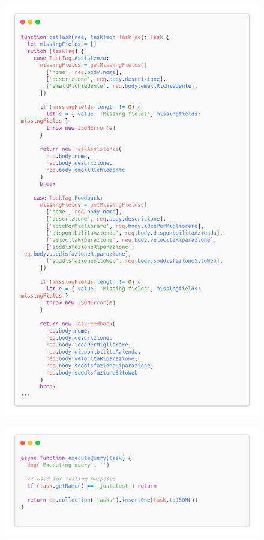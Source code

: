 \documentclass{report}
\begin{document}
\begin{figure}[H]
	\centering\includegraphics[width=1\textwidth]{images/code_crea_task3.png}
\end{figure}
\begin{figure}[H]
	\centering\includegraphics[width=1\textwidth]{images/code_crea_task4.png}
\end{figure}
\end{document}
